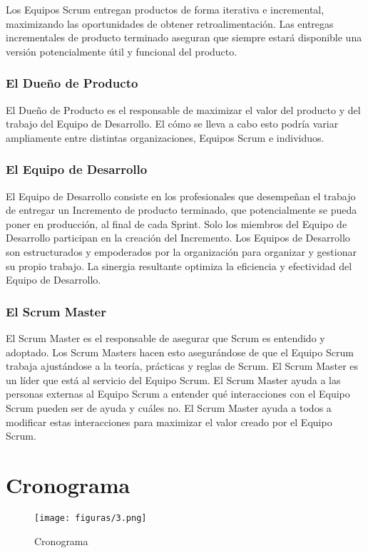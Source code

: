   Los Equipos Scrum entregan productos de forma iterativa e incremental, maximizando las oportunidades de obtener retroalimentación. Las entregas incrementales de producto terminado aseguran que siempre estará disponible una versión potencialmente útil y funcional del producto. 
  
  \subsubsection{El Dueño de Producto}
  El Dueño de Producto es el responsable de maximizar el valor del producto y del trabajo del Equipo de Desarrollo. El cómo se lleva a cabo esto podría variar ampliamente entre distintas organizaciones, Equipos Scrum e individuos.
  
  \subsubsection{El Equipo de Desarrollo}
  El Equipo de Desarrollo consiste en los profesionales que desempeñan el trabajo de entregar un Incremento de producto terminado, que potencialmente se pueda poner en producción, al final de cada Sprint. Solo los miembros del Equipo de Desarrollo participan en la creación del Incremento. Los Equipos de Desarrollo son estructurados y empoderados por la organización para organizar y gestionar su propio trabajo. La sinergia resultante optimiza la eficiencia y efectividad del Equipo de Desarrollo.
  
  \subsubsection{El Scrum Master}
  El Scrum Master es el responsable de asegurar que Scrum es entendido y adoptado. Los Scrum Masters hacen esto asegurándose de que el Equipo Scrum trabaja ajustándose a la teoría, prácticas y reglas de Scrum. El Scrum Master es un líder que está al servicio del Equipo Scrum. El Scrum Master ayuda a las personas externas al Equipo Scrum a entender qué interacciones con el Equipo Scrum pueden ser de ayuda y cuáles no. El Scrum Master ayuda a todos a modificar estas interacciones para maximizar el valor creado por el Equipo Scrum.

\section{Cronograma}
  \begin{figure}[!h]
  	\centering
  	\texttt{[image: figuras/3.png]}
  	\captionsetup{width=.95\textwidth}
  	\caption{Cronograma}
  	\label{figura3}
  \end{figure}

